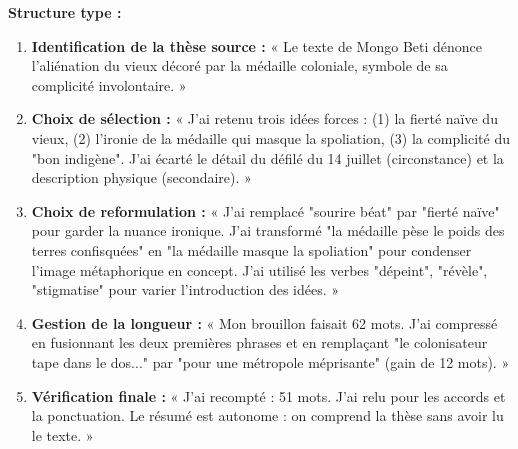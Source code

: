 \documentclass[11pt]{article}
\begin{document}
\begin{exemplebox}
\textbf{Structure type :}
\begin{enumerate}
\item \textbf{Identification de la thèse source :} « Le texte de Mongo Beti dénonce l'aliénation du vieux décoré par la médaille coloniale, symbole de sa complicité involontaire. »
\item \textbf{Choix de sélection :} « J'ai retenu trois idées forces : (1) la fierté naïve du vieux, (2) l'ironie de la médaille qui masque la spoliation, (3) la complicité du "bon indigène". J'ai écarté le détail du défilé du 14 juillet (circonstance) et la description physique (secondaire). »
\item \textbf{Choix de reformulation :} « J'ai remplacé "sourire béat" par "fierté naïve" pour garder la nuance ironique. J'ai transformé "la médaille pèse le poids des terres confisquées" en "la médaille masque la spoliation" pour condenser l'image métaphorique en concept. J'ai utilisé les verbes "dépeint", "révèle", "stigmatise" pour varier l'introduction des idées. »
\item \textbf{Gestion de la longueur :} « Mon brouillon faisait 62 mots. J'ai compressé en fusionnant les deux premières phrases et en remplaçant "le colonisateur tape dans le dos..." par "pour une métropole méprisante" (gain de 12 mots). »
\item \textbf{Vérification finale :} « J'ai recompté : 51 mots. J'ai relu pour les accords et la ponctuation. Le résumé est autonome : on comprend la thèse sans avoir lu le texte. »
\end{enumerate}
\end{exemplebox}
\end{document}
